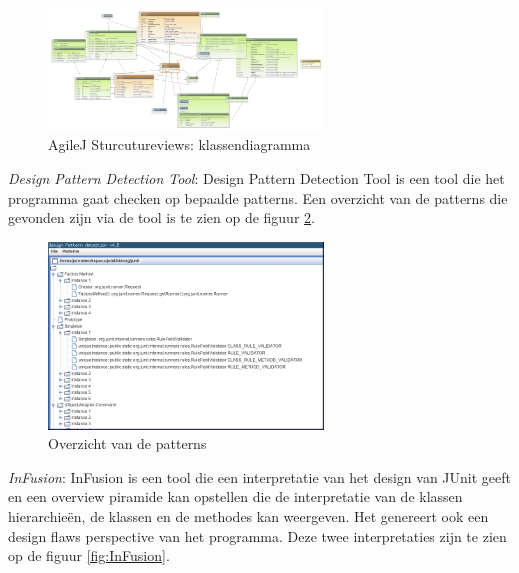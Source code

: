 \documentclass[i1]{oss}
\begin{document}
\begin{description}
\begin{figure}[h!]
	\centering
	\includegraphics[width=0.65\textwidth]{AgileJKlassendiagramma}
	\caption{AgileJ Sturcutureviews: klassendiagramma}
	\label{fig:AgileJKlassendia}
\end{figure}

\item \emph{Design Pattern Detection Tool}: Design Pattern Detection Tool is een tool die het programma gaat checken op bepaalde patterns. Een overzicht van de patterns die gevonden zijn via de tool is te zien op de figuur \ref{fig:DesignPatterns}. 

\begin{figure}[h!]
	\centering
	\includegraphics[width=0.65\textwidth]{Patterns1}
	\caption{Overzicht van de patterns}
	\label{fig:DesignPatterns}
\end{figure}

\item \emph{InFusion}: InFusion is een tool die een interpretatie van het design van JUnit geeft en een overview piramide kan opstellen die de interpretatie van de klassen hierarchie\"en, de klassen en de methodes kan weergeven. Het genereert ook een design flaws perspective van het programma. Deze twee interpretaties zijn te zien op de figuur \ref{fig:InFusion}.




\end{description}
\end{document}
